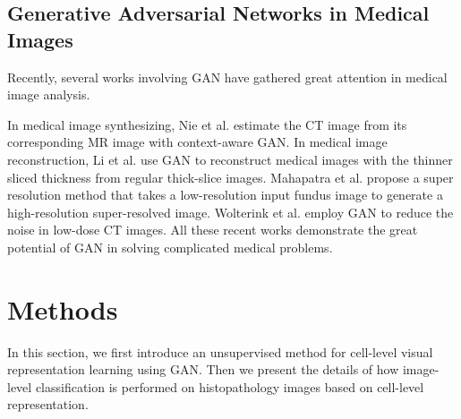 \documentclass[journal]{IEEEtran}
\begin{document}
\subsection{Generative Adversarial Networks in Medical Images}
Recently, several works involving GAN have gathered great attention in medical image analysis.

In medical image synthesizing, Nie et al. \cite{nie2017medical} estimate the CT image from its corresponding MR image with context-aware GAN. In medical image reconstruction, Li et al. \cite{Li2017Reconstruction} use GAN to reconstruct medical images with the thinner sliced thickness from regular thick-slice images. Mahapatra et al. \cite{Mahapatra2017Image} propose a super resolution method that takes a low-resolution input fundus image to generate a high-resolution super-resolved image. Wolterink et al. \cite{Wolterink2017Generative} employ GAN to reduce the noise in low-dose CT images. All these recent works demonstrate the great potential of GAN in solving complicated medical problems.

\section{Methods}

In this section, we first introduce an unsupervised method for cell-level visual representation learning using GAN. Then we present the details of how image-level classification is performed on histopathology images based on cell-level representation.
\end{document}
